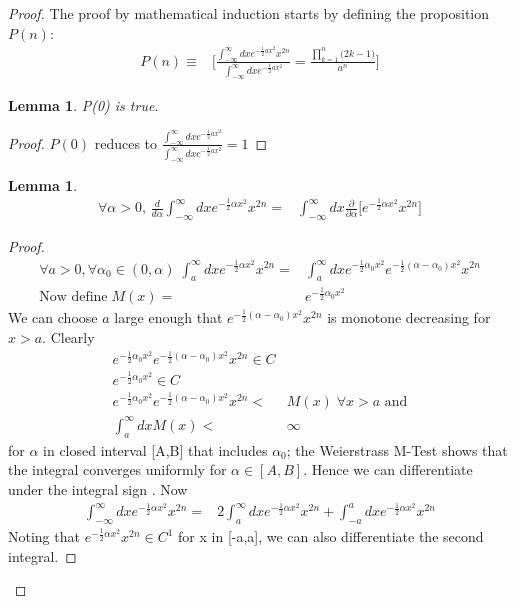 \documentclass[]{article}
\newtheorem{lemma}[thm]{Lemma}
\begin{document}
\begin{proof}
	The proof by mathematical induction starts by defining the proposition $P(n)$:
	\begin{align*}
		P(n) \equiv& \bigg[\frac{\int_{-\infty}^\infty dx e^{-\frac{1}{2}ax^2}x^{2n}}{\int_{-\infty}^\infty dx e^{-\frac{1}{2}ax^2}}=\frac{\prod_{k=1}^{n}\big(2k-1\big)}{a^n}\bigg]
	\end{align*}
	\begin{lemma}\label{thm:P_0}
		P(0) is true.
	\end{lemma}
	\begin{proof}
		$P(0)$ reduces to $\frac{\int_{-\infty}^\infty dx e^{-\frac{1}{2}ax^2}}{\int_{-\infty}^\infty dx e^{-\frac{1}{2}ax^2}}=1$
	\end{proof}
    \begin{lemma}\label{lemma:uniform:convergence}
    	\begin{align*}
    		\forall \alpha >0 \text{, }\frac{d}{d\alpha}\int_{-\infty}^\infty dx e^{-\frac{1}{2}\alpha x^2}x^{2n} =&\int_{-\infty}^\infty dx \frac{\partial}{\partial \alpha} \big[e^{-\frac{1}{2}\alpha x^2}x^{2n}\big]
    	\end{align*}
    \end{lemma}
	\begin{proof}
		\begin{align*}
			\forall a>0, \forall \alpha_0 \in (0,\alpha)\; \int_{a}^\infty dx e^{-\frac{1}{2}\alpha x^2}x^{2n} =&\int_{a}^\infty dx e^{-\frac{1}{2}\alpha_0 x^2} e^{-\frac{1}{2}(\alpha-\alpha_0) x^2}x^{2n} \\
			\text{Now define}\; M(x) =& e^{-\frac{1}{2}\alpha_0 x^2}
		\end{align*}
		We can choose $a$ large enough that $e^{-\frac{1}{2}(\alpha-\alpha_0) x^2}x^{2n}$ is monotone decreasing for $x>a$. Clearly
		\begin{align*}
			e^{-\frac{1}{2}\alpha_0 x^2} e^{-\frac{1}{2}(\alpha-\alpha_0) x^2}x^{2n} \in C\\
				e^{-\frac{1}{2}\alpha_0 x^2} \in C\\
			e^{-\frac{1}{2}\alpha_0 x^2} e^{-\frac{1}{2}(\alpha-\alpha_0) x^2}x^{2n}<&M(x)\; \forall x>a \text{ and}\\
			\int_{a}^\infty dx M(x)<&\infty
		\end{align*}
		 for $\alpha$ in closed interval [A,B] that includes $\alpha_0$; the Weierstrass M-Test \cite[Chapter 10, 6.1]{widder1961advanced} shows that the integral converges uniformly for $\alpha\in[A,B]$. Hence we can differentiate under the integral sign \cite[Chapter 10, 8.3]{widder1961advanced}.
		Now
		\begin{align*}
			\int_{-\infty}^\infty dx e^{-\frac{1}{2}\alpha x^2}x^{2n} =& 2 \int_{a}^\infty dx e^{-\frac{1}{2}\alpha x^2}x^{2n} + \int_{-a}^a dx e^{-\frac{1}{2}\alpha x^2}x^{2n}
		\end{align*}
	Noting that $e^{-\frac{1}{2}\alpha x^2}x^{2n} \in C^1$ for x in [-a,a], we can also differentiate the second integral.
	\end{proof}


\end{proof}
\end{document}
